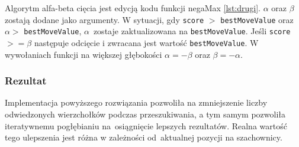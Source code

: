 Algorytm alfa-beta cięcia jest edycją kodu funkcji negaMax \ref{lst:drugi}.
$\alpha$ oraz $\beta$ zostają dodane jako argumenty.
W sytuacji, gdy \texttt{score} $>$ \texttt{bestMoveValue} oraz $\alpha >$ \texttt{bestMoveValue}, $\alpha$~zostaje zaktualizowana na \texttt{bestMoveValue}.
Jeśli \texttt{score} $>=\beta$ następuje odcięcie i zwracana jest wartość \texttt{bestMoveValue}.
W wywołaniach funkcji na większej głębokości $\alpha = -\beta$ oraz $\beta = -\alpha$.

\subsubsection{Rezultat}

Implementacja powyższego rozwiązania pozwoliła na zmniejszenie liczby odwiedzonych wierzchołków podczas przeszukiwania, a tym samym pozwoliła iteratywnemu pogłębianiu na~osiągnięcie lepszych rezultatów.
Realna wartość tego ulepszenia jest różna w zależności od~aktualnej pozycji na szachownicy.